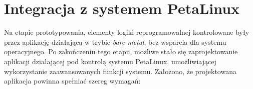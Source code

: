 



\section{Integracja z systemem PetaLinux}

Na etapie prototypowania, elementy logiki reprogramowalnej kontrolowane były przez aplikację działającą w trybie \textit{bare-metal}, bez wsparcia dla systemu operacyjnego.
Po zakończeniu tego etapu, możliwe stało się zaprojektowanie aplikacji działającej pod kontrolą systemu PetaLinux, umożliwiającej wykorzystanie zaawansowanych funkcji systemu.
Założono, że projektowana aplikacja powinna spełniać szereg wymagań:

